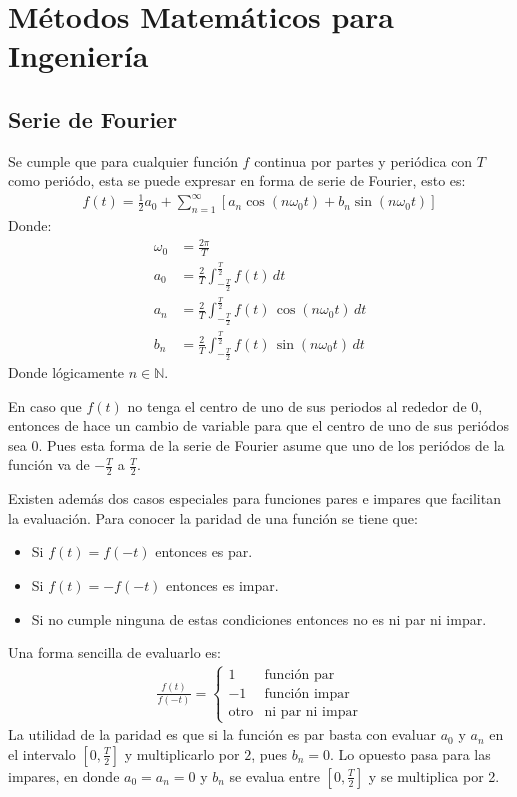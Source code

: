\section{Métodos Matemáticos para Ingeniería}

\subsection{Serie de Fourier}
Se cumple que para cualquier función $f$ continua por partes y periódica con $T$ como periódo, esta se puede expresar en forma de serie de Fourier, esto es:
\begin{align*}
    f(t) = \frac{1}{2} a_0 + \sum_{n =1}^{\infty} \left[a_n \cos(n\omega_0t) + b_n \sin(n\omega_0t)\right]
\end{align*}
Donde:
\begin{align*}
    \omega_0 &= \frac{2\pi}{T}\\
    a_0 &= \frac{2}{T} \int_{-\frac{T}{2}}^{\frac{T}{2}} f(t)\,dt\\
    a_n &= \frac{2}{T} \int_{-\frac{T}{2}}^{\frac{T}{2}} f(t)\,\cos(n\omega_0t)\,dt\\
    b_n &= \frac{2}{T} \int_{-\frac{T}{2}}^{\frac{T}{2}} f(t)\,\sin(n\omega_0t)\,dt
\end{align*}
Donde lógicamente $n\in\mathbb{N}$.

En caso que $f(t)$ no tenga el centro de uno de sus periodos al rededor de $0$, entonces de hace un cambio de variable para que el centro de uno de sus periódos sea $0$. Pues esta forma de la serie de Fourier asume que uno de los periódos de la función va de $-\frac{T}{2}$ a $\frac{T}{2}$.

Existen además dos casos especiales para funciones pares e impares que facilitan la evaluación. Para conocer la paridad de una función se tiene que:
\begin{itemize}
    \item Si $f(t) = f(-t)$ entonces es par.
    \item Si $f(t) = -f(-t)$ entonces es impar.
    \item Si no cumple ninguna de estas condiciones entonces no es ni par ni impar.
\end{itemize}
Una forma sencilla de evaluarlo es:
\begin{align*}
    \frac{f(t)}{f(-t)} = \begin{cases}
        1 & \text{función par}\\
        -1 & \text{función impar}\\
        \text{otro} & \text{ni par ni impar}
    \end{cases}
\end{align*}
La utilidad de la paridad es que si la función es par basta con evaluar $a_0$ y $a_n$ en el intervalo $\left[0, \frac{T}{2}\right]$ y multiplicarlo por $2$, pues $b_n = 0$. Lo opuesto pasa para las impares, en donde $a_0 = a_n = 0$ y $b_n$ se evalua entre $\left[0, \frac{T}{2}\right]$ y se multiplica por 2.